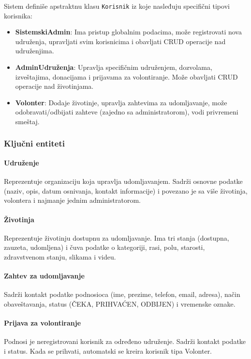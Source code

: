 Sistem definiše apstraktnu klasu \texttt{Korisnik} iz koje nasleđuju specifični tipovi korisnika:

\begin{itemize}
    \item \textbf{SistemskiAdmin}: Ima pristup globalnim podacima, može registrovati nova udruženja, upravljati svim korisnicima i obavljati CRUD operacije nad udruženjima.
    \item \textbf{AdminUdruženja}: Upravlja specifičnim udruženjem, dozvolama, izveštajima, donacijama i prijavama za volontiranje. Može obavljati CRUD operacije nad životinjama.
    \item \textbf{Volonter}: Dodaje životinje, upravlja zahtevima za udomljavanje, može odobravati/odbijati zahteve (zajedno sa administratorom), vodi privremeni smeštaj.
\end{itemize}

\subsubsection{Ključni entiteti}

\paragraph{Udruženje}
Reprezentuje organizaciju koja upravlja udomljavanjem. Sadrži osnovne podatke (naziv, opis, datum osnivanja, kontakt informacije) i povezano je sa više životinja, volontera i najmanje jednim administratorom.

\paragraph{Životinja}
Reprezentuje životinju dostupnu za udomljavanje. Ima tri stanja (dostupna, zauzeta, udomljena) i čuva podatke o kategoriji, rasi, polu, starosti, zdravstvenom stanju, slikama i videu.

\paragraph{Zahtev za udomljavanje}
Sadrži kontakt podatke podnosioca (ime, prezime, telefon, email, adresa), način obaveštavanja, status (ČEKA, PRIHVAĆEN, ODBIJEN) i vremenske oznake.

\paragraph{Prijava za volontiranje}
Podnosi je neregistrovani korisnik za određeno udruženje. Sadrži kontakt podatke i status. Kada se prihvati, automatski se kreira korisnik tipa Volonter.

